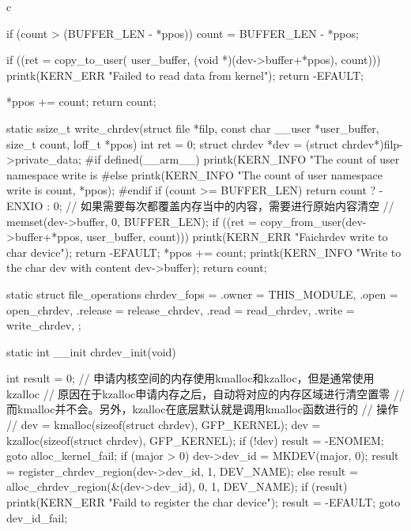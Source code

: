 \begin{code-block}{c}
{        if (count > (BUFFER_LEN - *ppos)) {
                count = BUFFER_LEN - *ppos;
        }

        if ((ret = copy_to_user(
                user_buffer, (void *)(dev->buffer+*ppos), count))) {
                printk(KERN_ERR "Failed to read data from kernel\n");
                return -EFAULT;
        }

        *ppos += count;
        return count;
}

static ssize_t write_chrdev(struct file *filp,
        const char __user *user_buffer, size_t count, loff_t *ppos)
{
        int ret = 0;
        struct chrdev *dev = (struct chrdev*)filp->private_data;
#if defined(__arm__)
        printk(KERN_INFO "The count of user namespace write is %
#else
        printk(KERN_INFO "The count of user namespace write is %
                count, *ppos);
#endif
        if (count >= BUFFER_LEN) {
                return count ? -ENXIO : 0;
        }
        // 如果需要每次都覆盖内存当中的内容，需要进行原始内容清空
        // memset(dev->buffer, 0, BUFFER_LEN);
        if ((ret = copy_from_user(dev->buffer+*ppos, user_buffer, count))) {
                printk(KERN_ERR "Faichrdev write to char device\n");
                return -EFAULT;
        }
        *ppos += count;
        printk(KERN_INFO "Write to the char dev with content %
                dev->buffer);
        return count;
}

static struct file_operations chrdev_fops = {
        .owner   = THIS_MODULE,
        .open    = open_chrdev,
        .release = release_chrdev,
        .read    = read_chrdev,
        .write   = write_chrdev,
};

static int __init chrdev_init(void)
{
        int result = 0;
        // 申请内核空间的内存使用kmalloc和kzalloc，但是通常使用kzalloc
        // 原因在于kzalloc申请内存之后，自动将对应的内存区域进行清空置零
        // 而kmalloc并不会。另外，kzalloc在底层默认就是调用kmalloc函数进行的
        // 操作
        // dev = kmalloc(sizeof(struct chrdev), GFP_KERNEL);
        dev = kzalloc(sizeof(struct chrdev), GFP_KERNEL);
        if (!dev) {
                result = -ENOMEM;
                goto alloc_kernel_fail;
        }
        if (major > 0) {
                dev->dev_id = MKDEV(major, 0);
                result = register_chrdev_region(dev->dev_id, 1, DEV_NAME);
        } else {
                result = alloc_chrdev_region(&(dev->dev_id), 0, 1, DEV_NAME);
        }
        if (result) {
                printk(KERN_ERR "Faild to register the char device\n");
                result = -EFAULT;
                goto dev_id_fail;
        }

}
\end{code-block}

